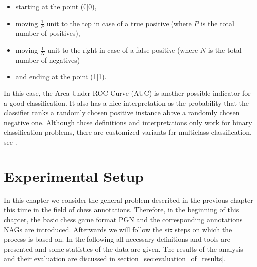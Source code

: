 \documentclass[article,type=msc,colorback,accentcolor=tud7b]{tudthesis}
\begin{document}
    \begin{itemize}[noitemsep]
      \item starting at the point (0|0),
      \item moving $\frac{1}{P}$ unit to the top in case of a true positive (where $P$ is the total number of positives),
      \item moving $\frac{1}{N}$ unit to the right in case of a false positive (where $N$ is the total number of negatives)
      \item and ending at the point (1|1).
    \end{itemize}
    In this case, the Area Under ROC Curve (AUC) is another possible indicator for a good classification. It also has a nice interpretation as the probability that the classifier ranks a randomly chosen positive instance above a randomly chosen negative one. Although those definitions and interpretations only work for binary classification problems, there are customized variants for multiclass classification, see \autocite{Hand2001}.

  \clearpage
  
  \section{Experimental Setup}
  \label{sec:experimental_setup}
    In this chapter we consider the general problem described in the previous chapter this time in the field of chess annotations. Therefore, in the beginning of this chapter, the basic chess game format PGN and the corresponding annotations NAGs are introduced. Afterwards we will follow the six steps on which the process is based on. In the following all necessary definitions and tools are presented and some statistics of the data are given. The results of the analysis and their evaluation are discussed in section~\ref{sec:evaluation_of_results}.
    
\end{document}
